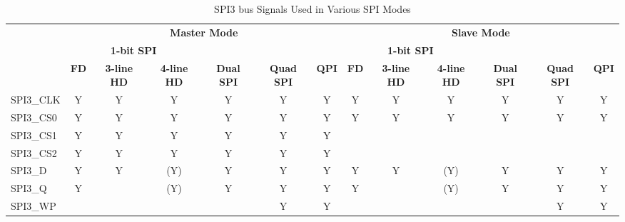 \documentclass[main\_\_EN.tex]{subfiles}
\begin{document}
\begin{landscape}
\begin{table}[H]
    \centering
    \caption{SPI3 bus Signals Used in Various SPI Modes}
    \label{tab:spi3-bus-singals-used-in-various-spi-modes}

    \begin{threeparttable}
    \begin{tabular}{ |p{2.0cm} |c|c|c|c|c|c|c|c|c|c|c|c| }
    \hline
        \rowcolor{lightgray}
        & \multicolumn{6}{c|}{\textbf{Master Mode}} & \multicolumn{6}{c|}{\textbf{Slave Mode}} \\\cline{2-13}
        \rowcolor{lightgray}
        & \multicolumn{3}{c|}{\textbf{1-bit SPI}} & & & & \multicolumn{3}{c|}{\textbf{1-bit SPI}} & & & \\ \cline{2-4} \cline{8-10}
        \rowcolor{lightgray}
        \multirow{-3}{*}{\textbf{SPI3 Signal}} & \textbf{FD\tnote{1}} & \textbf{3-line HD\tnote{2}} & \textbf{4-line HD} & \multirow{-2}{*}{\textbf{Dual SPI}} & \multirow{-2}{*}{\textbf{Quad SPI}} & \multirow{-2}{*}{\textbf{QPI}} & \textbf{FD} & \textbf{3-line HD} & \textbf{4-line HD} & \multirow{-2}{*}{\textbf{Dual SPI}} & \multirow{-2}{*}{\textbf{Quad SPI}} & \multirow{-2}{*}{\textbf{QPI}} \\ \hline
SPI3\_CLK                  & Y       & Y       & Y       & Y       & Y       & Y      & Y       & Y      & Y       & Y       & Y       & Y      \\ \hline
SPI3\_CS0                  & Y       & Y       & Y       & Y       & Y       & Y      & Y       & Y      & Y       & Y       & Y       & Y      \\ \hline
SPI3\_CS1                  & Y       & Y       & Y       & Y       & Y       & Y      &         &        &         &         &         &        \\ \hline
SPI3\_CS2                  & Y       & Y       & Y       & Y       & Y       & Y      &         &        &         &         &         &        \\ \hline
SPI3\_D                    & Y       & Y       & (Y)\tnote{3}      & Y\tnote{4}      & Y\tnote{5}      & Y      & Y       & Y      & (Y)\tnote{6}      & Y\tnote{7}     & Y\tnote{8}     & Y      \\ \hline
SPI3\_Q                    & Y       &         & (Y)\tnote{3}      & Y\tnote{4}      & Y\tnote{5}      & Y      & Y       &        & (Y)\tnote{6}     & Y\tnote{7}     & Y\tnote{8}      & Y      \\ \hline
SPI3\_WP                   &         &         &         &         & Y\tnote{5}      & Y      &         &        &         &         & Y\tnote{8}       & Y      \\ \hline

\end{tabular}
\end{threeparttable}
\end{table}
\end{landscape}
\end{document}
